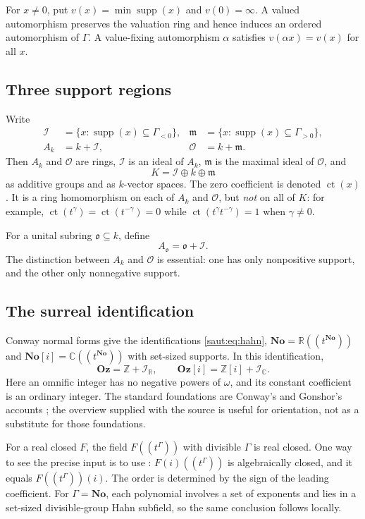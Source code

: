 \documentclass[11pt]{article}
\theoremstyle{definition}
\theoremstyle{remark}
\newcommand{\No}{\mathbf{No}}
\newcommand{\R}{\mathbb R}
\newcommand{\C}{\mathbb C}
\newcommand{\Z}{\mathbb Z}
\newcommand{\OO}{\mathcal O}
\newcommand{\mm}{\mathfrak m}
\newcommand{\supp}{\operatorname{supp}}
\newcommand{\Oz}{\mathbf{Oz}}
\newcommand{\ct}{\operatorname{ct}}
\newcommand{\Ineg}{\mathcal I}
\numberwithin{equation}{section}
\begin{document}
For $x\ne0$, put $v(x)=\min\supp(x)$ and $v(0)=\infty$. A valued automorphism
preserves the valuation ring and hence induces an ordered automorphism of $\Gamma$.
A value-fixing automorphism $\alpha$ satisfies $v(\alpha x)=v(x)$ for all $x$.

\subsection{Three support regions}

Write
\begin{align*}
 \Ineg&=\{x:\supp(x)\subseteq\Gamma_{<0}\},&
 \mm&=\{x:\supp(x)\subseteq\Gamma_{>0}\},\\
 A_k&=k+\Ineg,& \OO&=k+\mm.
\end{align*}
Then $A_k$ and $\OO$ are rings, $\Ineg$ is an ideal of $A_k$, $\mm$ is the maximal
ideal of $\OO$, and
\begin{equation}\label{saut:fs:eq:three-parts}
 K=\Ineg\oplus k\oplus\mm
\end{equation}
as additive groups and as $k$-vector spaces. The zero coefficient is denoted
$\ct(x)$. It is a ring homomorphism on each of $A_k$ and $\OO$, but \emph{not} on all
of $K$: for example, $\ct(t^\gamma)=\ct(t^{-\gamma})=0$ while
$\ct(t^\gamma t^{-\gamma})=1$ when $\gamma\ne0$.

For a unital subring $\mathfrak o\subseteq k$, define
\[
 A_{\mathfrak o}=\mathfrak o+\Ineg.
\]
The distinction between $A_k$ and $\OO$ is essential: one has only nonpositive
support, and the other only nonnegative support.

\subsection{The surreal identification}

Conway normal forms give the identifications \eqref{saut:eq:hahn}, $\No=\R((t^{\No}))$
and $\No[i]=\C((t^{\No}))$ with set-sized supports. In this identification,
\begin{equation}\label{saut:fs:eq:omnific-hahn}
 \Oz=\Z+\Ineg_{\R},\qquad
 \Oz[i]=\Z[i]+\Ineg_{\C}.
\end{equation}
Here an omnific integer has no negative powers of $\omega$, and its constant
coefficient is an ordinary integer. The standard foundations are Conway's and
Gonshor's accounts \cite{Conway,Gonshor}; the overview \cite{Wiki} supplied with the
source is useful for orientation, not as a substitute for those foundations.

For a real closed $F$, the field $F((t^\Gamma))$ with divisible $\Gamma$ is real
closed. One way to see the precise input is to use \cite[Corollary~4]{Poonen}:
$F(i)((t^\Gamma))$ is algebraically closed, and it equals $F((t^\Gamma))(i)$. The
order is determined by the sign of the leading coefficient. For $\Gamma=\No$, each
polynomial involves a set of exponents and lies in a set-sized divisible-group Hahn
subfield, so the same conclusion follows locally.
\end{document}
